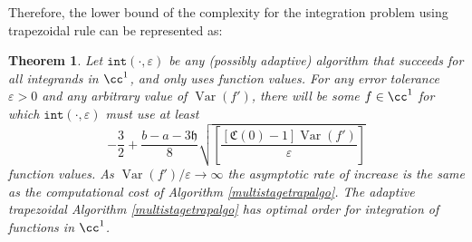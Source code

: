 \documentclass{iitthesis}
\DeclareMathOperator{\Var}{Var}
\newtheorem{theorem}{Theorem}
\theoremstyle{definition}
\theoremstyle{remark}
\begin{document}
Therefore, the lower bound of the complexity for the integration problem using trapezoidal rule can be represented as:
\begin{theorem} \label{comptrap}
Let $\texttt{int}(\cdot,\varepsilon)$ be any (possibly adaptive) algorithm that succeeds for all integrands in $\cc^1$, and only uses function values. For any error tolerance $\varepsilon > 0$ and any arbitrary value of $\Var(f')$, there will be some $f\in \cc^1$ for which $\texttt{int}(\cdot,\varepsilon)$ must use at least
    \begin{equation}\label{complowbdtrap}
        -\frac{3}{2}+\frac{b-a-3\mathfrak{h}}{8}\sqrt{\left[\frac{[\mathfrak{C}(0)-1]\Var( f')}{\varepsilon}\right]}
    \end{equation}
    function values. As $\Var(f')/\varepsilon \rightarrow \infty$ the asymptotic rate of increase is the same as the computational cost of Algorithm \ref{multistagetrapalgo}. The adaptive trapezoidal Algorithm \ref{multistagetrapalgo} has optimal order for integration of functions in $\cc^1$.
\end{theorem}
\end{document}
